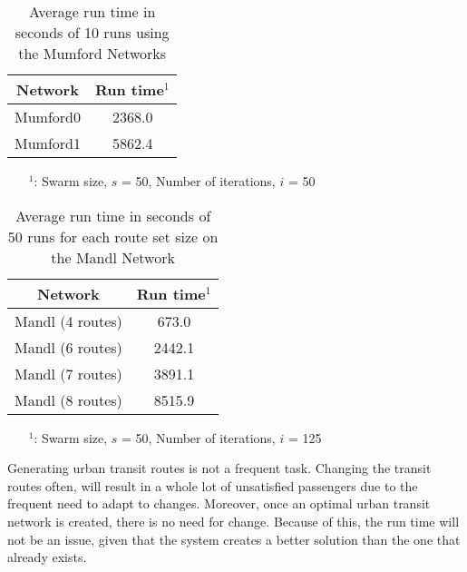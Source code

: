 
\begin{table}[H]
    \centering
    \hspace*{-1.0cm}
    \begin{tabular}{|c|c|}
        \hline
        \textbf{Network} & \textbf{Run time$^1$ } \\
        \hline
        Mumford0 & 2368.0\\
        
        Mumford1 & 5862.4\\
        \hline
    \end{tabular}
    \caption{Average run time in seconds of 10 runs using the Mumford Networks}
    \label{tabel:runTimeMumford}
    \begin{itemize}[noitemsep]
    \item[$^1$:] Swarm size, $s$ = 50, Number of iterations, $i$ = 50
    \end{itemize} 
\end{table}

\begin{table}[H]
    \centering
    \hspace*{-1.0cm}
    \begin{tabular}{|c|c|}
        \hline
        \textbf{Network} & \textbf{Run time$^1$}\\
        \hline
        Mandl (4 routes) & 673.0\\
        
        Mandl (6 routes) & 2442.1\\
      
        Mandl (7 routes) & 3891.1\\
       
        Mandl (8 routes) & 8515.9\\
        \hline
    \end{tabular}
    \caption{Average run time in seconds of 50 runs for each route set size on the Mandl Network}
    \begin{itemize}[noitemsep]
    \item[$^1$:] Swarm size, $s$ = 50, Number of iterations, $i$ = 125
    \end{itemize} 
    \label{tabel:runTimeMandl}
\end{table}

Generating urban transit routes is not a frequent task. Changing the transit routes often, will result in a whole lot of unsatisfied passengers due to the frequent need to adapt to changes. Moreover, once an optimal urban transit network is created, there is no need for change. Because of this, the run time will not be an issue, given that the system creates a better solution than the one that already exists. 